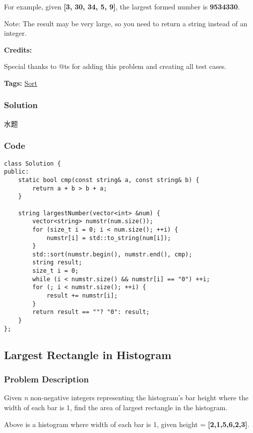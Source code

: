\documentclass{article}
\begin{document}
\begin{CJK*}{UTF8}{gkai}
For example, given \textbf{[3, 30, 34, 5, 9]}, the largest formed number is \textbf{9534330}.

Note: The result may be very large, so you need to return a string instead of an integer.

\textbf{Credits:}

Special thanks to @ts for adding this problem and creating all test cases.


\textbf{Tags: }
\hyperref[ Sort ]{ Sort }



\subsubsection*{Solution}
水题

\subsubsection*{Code}
\begin{lstlisting}
class Solution {
public:
    static bool cmp(const string& a, const string& b) {
        return a + b > b + a;
    }
    
    string largestNumber(vector<int> &num) {
        vector<string> numstr(num.size());
        for (size_t i = 0; i < num.size(); ++i) {
            numstr[i] = std::to_string(num[i]);
        }
        std::sort(numstr.begin(), numstr.end(), cmp);
        string result;
        size_t i = 0;
        while (i < numstr.size() && numstr[i] == "0") ++i;
        for (; i < numstr.size(); ++i) {
            result += numstr[i];
        }
        return result == ""? "0": result;
    }
};

\end{lstlisting}


\subsection{ Largest Rectangle in Histogram }
\label{ Largest Rectangle in Histogram }

\subsubsection*{Problem Description}
Given \emph{n} non-negative integers representing the histogram's bar height where the width of each bar is 1, find the area of largest rectangle in the histogram.

Above is a histogram where width of each bar is 1, given height = \textbf{[2,1,5,6,2,3]}.


\end{CJK*}
\end{document}
